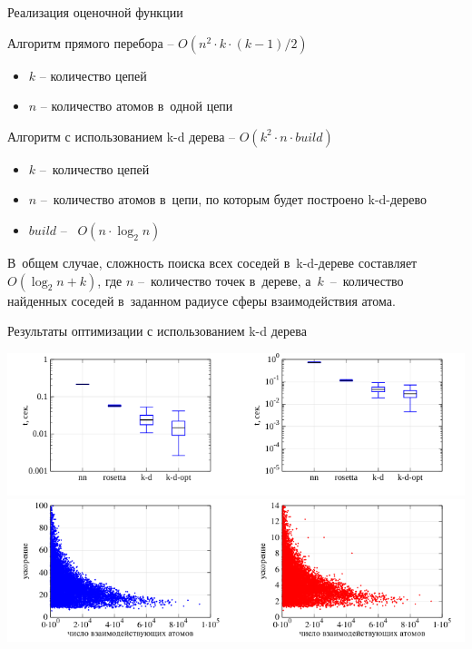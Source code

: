 \documentclass[sans,aspectratio=169]{beamer}
\begin{document}
\begin{frame}{Реализация оценочной функции}

	\fontsize{11}{12}\selectfont
	\hangindent=-0.5cm
	 \noindent
	\setlength{\leftmargini}{20pt}
	
	\vspace{-5pt}	
	Алгоритм прямого перебора -- $O(n^2{\cdot}k{\cdot}(k-1)/2)$
	
	\begin{itemize}
		\item $k$ -- количество цепей
		\item $n$ -- количество атомов в~одной цепи
	\end{itemize}		
	
	\vspace{4mm}	
	
	Алгоритм с использованием k-d дерева	-- $O(k^2 \cdot n \cdot build)$
	
	\begin{itemize}
		\item $k$ --~количество цепей
		\item $n$ --~количество атомов в~цепи, по которым будет построено k-d-дерево
		\item $build$ -- ~$O(n \cdot \log_{2}{n})$
	\end{itemize}
	
	\vspace{4mm}	
	
	В~общем случае, сложность поиска всех соседей в~k-d-дереве составляет $O(\log_{2}{n} + k)$, где $n$ --~количество точек в~дереве, а~$k$~--~количество найденных соседей в~заданном радиусе сферы взаимодействия атома.

\end{frame}



\begin{frame}{Результаты оптимизации с использованием k-d дерева}
	\fontsize{11}{12}\selectfont
	\hangindent=-0.5cm
	 \noindent
	\setlength{\leftmargini}{20pt}
	
	\centering
	\vspace{-3pt}
	\includegraphics[scale=0.9]{images/bxpt.pdf}
	\vspace{4mm}
	\includegraphics[scale=0.9]{images/accel.pdf}
	
\end{frame}
\end{document}
